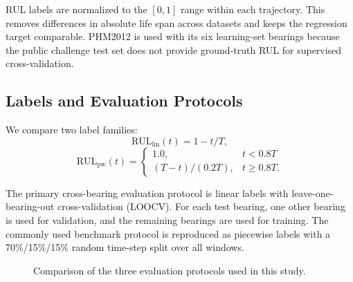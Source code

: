 \documentclass[pdflatex,sn-mathphys-num]{sn-jnl}
\begin{document}
RUL labels are normalized to the $[0,1]$ range within each trajectory. This removes differences in absolute life span across datasets and keeps the regression target comparable. PHM2012 is used with its six learning-set bearings because the public challenge test set does not provide ground-truth RUL for supervised cross-validation.

\subsection{Labels and Evaluation Protocols}
We compare two label families:
\begin{equation}
\text{RUL}_{\text{lin}}(t) = 1 - t/T,
\label{eq:linear}
\end{equation}
\begin{equation}
\text{RUL}_{\text{pw}}(t) =
\begin{cases}
1.0, & t < 0.8T \\
(T - t)/(0.2T), & t \geq 0.8T.
\end{cases}
\label{eq:piecewise}
\end{equation}

The primary cross-bearing evaluation protocol is linear labels with leave-one-bearing-out cross-validation (LOOCV). For each test bearing, one other bearing is used for validation, and the remaining bearings are used for training. The commonly used benchmark protocol is reproduced as piecewise labels with a 70\%/15\%/15\% random time-step split over all windows.

\begin{figure}[t]
\centering
{}
\caption{Comparison of the three evaluation protocols used in this study.}
\label{fig:protocols}
\end{figure}
\end{document}
